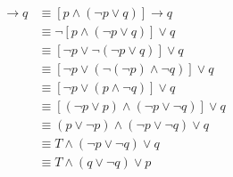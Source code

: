 \documentclass[12pt letter]{report}
\begin{document}
{\begin{enumerate}
          \begin{align*}
            [p \wedge \left( p \to q \right) ] \to q & \equiv [p \wedge \left( \neg p \vee q \right) ] \to q
            \tag*{Conditional Disjunction Equivalence}                                                                                               \\
                                                     & \equiv \neg [p \wedge \left( \neg p \vee q \right) ] \vee q
            \tag*{Conditional Disjunction Equivalence}                                                                                               \\
                                                     & \equiv [\neg p \vee \neg \left( \neg p \vee q \right) ]
            \vee q \tag*{By the First De Morgan's Law}                                                                                               \\
                                                     & \equiv [\neg p \vee \left( \neg \left( \neg p \right)
              \wedge \neg q \right) ] \vee q \tag*{By the Second De
            Morgan's Law}                                                                                                                            \\
                                                     & \equiv [\neg p \vee \left( p \wedge \neg q \right) ] \vee q \tag*{By the Double Negation Law} \\
                                                     & \equiv [ \left( \neg p \vee p \right) \wedge \left( \neg p
            \vee \neg q \right)  ] \vee  q \tag*{By the First Distributive Law}                                                                      \\
                                                     & \equiv \left( p \vee \neg p \right) \wedge \left( \neg p
            \vee \neg q \right) \vee q \tag*{By the First Commutative
            Law}                                                                                                                                     \\
                                                     & \equiv T \wedge \left( \neg p \vee \neg q \right) \vee q
            \tag*{By the First Negation Law}                                                                                                         \\
                                                     & \equiv T \wedge (q \vee \neg q) \vee p \tag*{By the First
}
\end{align*}
\end{enumerate}}
\end{document}
